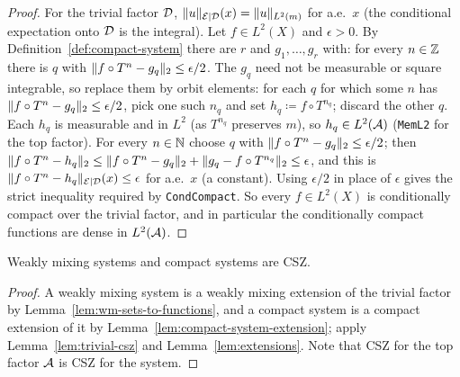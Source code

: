 \begin{proof}
  For the trivial factor $\mathcal{D}$, $\lVert u \rVert_{\mathcal{E} \mid \mathcal{D}}(x) = \lVert u \rVert_{L^2(m)}$ for a.e.\ $x$ (the
  conditional expectation onto $\mathcal{D}$ is the integral).  Let $f \in L^2(X)$ and $\epsilon > 0$.
  By Definition~\ref{def:compact-system} there are $r$ and $g_1,\dots,g_r$ with: for every
  $n \in \mathbb{Z}$ there is $q$ with $\lVert f\circ T^n - g_q \rVert_2 \leq \epsilon/2$.  The $g_q$ need not
  be measurable or square integrable, so replace them by orbit elements: for each $q$ for
  which some $n$ has $\lVert f\circ T^n - g_q \rVert_2 \leq \epsilon/2$, pick one such $n_q$ and set
  $h_q \coloneqq f \circ T^{n_q}$; discard the other $q$.  Each $h_q$ is measurable and in $L^2$
  (as $T^{n_q}$ preserves $m$), so $h_q \in L^2(\mathcal{A})$ (\texttt{MemL2} for the top factor).
  For every $n \in \mathbb{N}$ choose $q$ with $\lVert f\circ T^n - g_q \rVert_2 \leq \epsilon/2$; then
  $\lVert f\circ T^n - h_q \rVert_2 \leq \lVert f\circ T^n - g_q \rVert_2 + \lVert g_q - f\circ T^{n_q} \rVert_2 \leq \epsilon$,
  and this is $\lVert f \circ T^n - h_q \rVert_{\mathcal{E} \mid \mathcal{D}}(x) \leq \epsilon$ for a.e.\ $x$ (a constant).  Using
  $\epsilon/2$ in place of $\epsilon$ gives the strict inequality required by
  \texttt{CondCompact}.  So every $f \in L^2(X)$ is conditionally compact over the trivial
  factor, and in particular the conditionally compact functions are dense in $L^2(\mathcal{A})$.
\end{proof}

\begin{corollary}
  \label{cor:wm-compact-are-csz}
  \leanok
  Weakly mixing systems and compact systems are CSZ.
\end{corollary}

\begin{proof}
  A weakly mixing system is a weakly mixing extension of the trivial factor by
  Lemma~\ref{lem:wm-sets-to-functions}, and a compact system is a compact extension of it by
  Lemma~\ref{lem:compact-system-extension}; apply Lemma~\ref{lem:trivial-csz} and
  Lemma~\ref{lem:extensions}.  Note that CSZ for the top factor $\mathcal{A}$ is CSZ for the system.
\end{proof}
